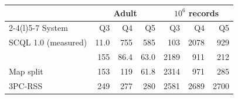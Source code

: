 \begin{tabular}{@{}lrrrrrr@{}}
\toprule
 & \multicolumn{3}{c}{Adult} & \multicolumn{3}{c}{$10^6$ records}\\
\cmidrule(lr){2-4}\cmidrule(l){5-7}
System & Q3 & Q4 & Q5 & Q3 & Q4 & Q5\\
\midrule
SCQL 1.0 (measured) & 11.0 & 755 & 585 & 103 & 2078 & 929\\
\textbf{\sys{}} & 155 & 86.4 & 63.0 & 2189 & 911 & 212\\
Map split & 153 & 119 & 61.8 & 2314 & 971 & 285\\
3PC-RSS & 249 & 277 & 280 & 2581 & 2689 & 2700\\
\bottomrule
\end{tabular}
